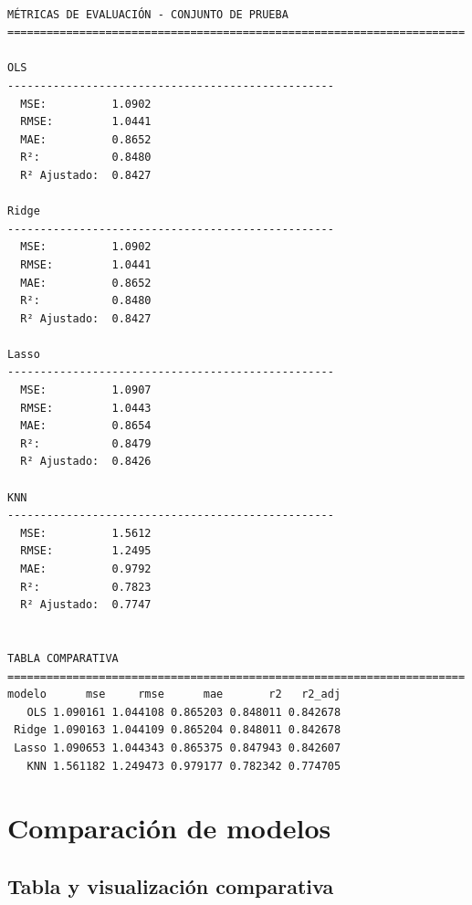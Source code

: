 \documentclass[
  doc,
  floatsintext,
  longtable,
  a4paper,
  nolmodern,
  notxfonts,
  notimes,
  12pt,
  colorlinks=true,linkcolor=blue,citecolor=blue,urlcolor=blue]{apa7}
\begin{document}
\begin{verbatim}

MÉTRICAS DE EVALUACIÓN - CONJUNTO DE PRUEBA
======================================================================

OLS
--------------------------------------------------
  MSE:          1.0902
  RMSE:         1.0441
  MAE:          0.8652
  R²:           0.8480
  R² Ajustado:  0.8427

Ridge
--------------------------------------------------
  MSE:          1.0902
  RMSE:         1.0441
  MAE:          0.8652
  R²:           0.8480
  R² Ajustado:  0.8427

Lasso
--------------------------------------------------
  MSE:          1.0907
  RMSE:         1.0443
  MAE:          0.8654
  R²:           0.8479
  R² Ajustado:  0.8426

KNN
--------------------------------------------------
  MSE:          1.5612
  RMSE:         1.2495
  MAE:          0.9792
  R²:           0.7823
  R² Ajustado:  0.7747


TABLA COMPARATIVA
======================================================================
modelo      mse     rmse      mae       r2   r2_adj
   OLS 1.090161 1.044108 0.865203 0.848011 0.842678
 Ridge 1.090163 1.044109 0.865204 0.848011 0.842678
 Lasso 1.090653 1.044343 0.865375 0.847943 0.842607
   KNN 1.561182 1.249473 0.979177 0.782342 0.774705
\end{verbatim}

\section{Comparación de modelos}\label{comparaciuxf3n-de-modelos}

\subsection{Tabla y visualización
comparativa}\label{tabla-y-visualizaciuxf3n-comparativa}
\end{document}

